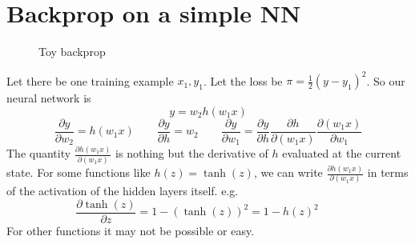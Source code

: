 \documentclass{article}
\newcommand{\beq}{\begin{equation}}
\newcommand{\eeq}{\end{equation}}
\newcommand{\pdd}[2]{\frac{\partial{#1}}{\partial{#2}}}
\begin{document}
\section{Backprop on a simple NN}
\begin{figure}
  \centering
{}
\caption{\label{fig:toybackprop} Toy backprop}
\end{figure}
Let there be one training example $x_1,y_1$. Let the loss be $\pi=\frac{1}{2}(y-y_1)^2$. So our neural network is
\beq
y = w_2h(w_1x)
\eeq
\beq
\pdd{y}{w_2} = h(w_1x) \qquad \pdd{y}{h}   = w_2 \qquad
\pdd{y}{w_1} = \pdd{y}{h}\pdd{h}{(w_1x)}\pdd{(w_1x)}{w_1}
\eeq
The quantity $\pdd{h(w_1x)}{(w_1x)}$ is nothing but the derivative of $h$ evaluated at the current state. For some functions like $h(z)=\tanh{(z)}$, we can write $\pdd{h(w_1x)}{(w_1x)}$ in terms of the activation of the hidden layers itself.
e.g.
\beq
\pdd{\tanh(z)}{z}= 1 - (\tanh{(z)})^2 = 1-h(z)^2 \qquad 
\eeq
For other functions it may not be possible or easy.
\end{document}
